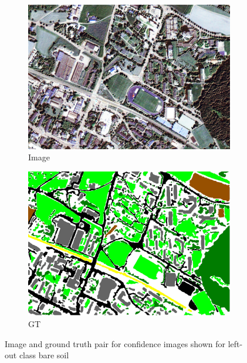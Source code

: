 \documentclass[10pt]{article}
\begin{document}
\begin{figure}[H]
	\centering
	\begin{subfigure}{.32\textwidth} 
		\includegraphics[width=\textwidth]{Im_19}
		\caption{Image}
	\end{subfigure}
	\begin{subfigure}{.32\textwidth}
		\includegraphics[width=\textwidth]{GT_19}
		\caption{\acrlong{GT}}
	\end{subfigure}
	\caption{Image and ground truth pair for confidence images shown for left-out class bare soil}
\end{figure}
\end{document}

